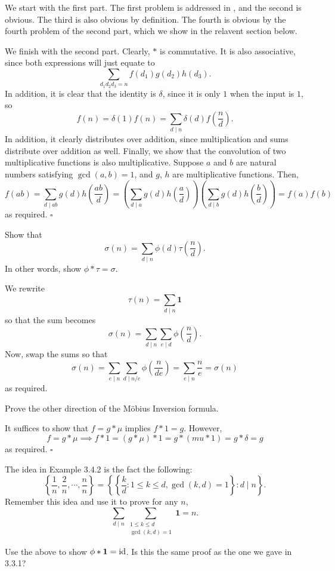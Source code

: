 \documentclass{article}
\begin{document}
We start with the first part. The first problem is addressed in , and the second is obvious. The third is also obvious by definition. The fourth is obvious by the fourth problem of the second part, which we show in the relavent section below.

We finish with the second part. Clearly, $*$ is commutative. It is also associative, since both expressions will just equate to \[\sum_{d_1d_2d_3 = n}f(d_1)g(d_2)h(d_3).\] In addition, it is clear that the identity is $\delta$, since it is only $1$ when the input is $1$, so \[f(n) = \delta(1)f(n) = \sum_{d \mid n}\delta(d)f\left(\dfrac{n}{d}\right).\] In addition, it clearly distributes over addition, since multiplication and sums distribute over addition as well. Finally, we show that the convolution of two multiplicative functions is also multiplicative. Suppose $a$ and $b$ are natural numbers satisfying $\gcd(a, b) = 1$, and $g$, $h$ are multiplicative functions. Then, \[f(ab) = \sum_{d \mid ab} g(d)h\left(\dfrac{ab}{d}\right) = \left(\sum_{d \mid a} g(d)h\left(\dfrac{a}{d}\right)\right)\left(\sum_{d \mid b} g(d)h\left(\dfrac{b}{d}\right)\right) = f(a)f(b)\] as required. $\square$

\begin{problem}[3.4.4]{}
Show that \[\sigma(n) = \sum_{d\mid n} \phi(d)\tau\left(\dfrac{n}{d}\right).\] In other words, show $\phi * \tau = \sigma$.
\end{problem}

We rewrite \[\tau(n) = \sum_{d \mid n} \mathbf{1}\] so that the sum becomes \[\sigma(n) = \sum_{d\mid n} \sum_{e \mid d} \phi\left(\dfrac{n}{d}\right).\] Now, swap the sums so that \[\sigma(n) = \sum_{e\mid n} \sum_{d \mid n/e} \phi\left(\dfrac{n}{de}\right) = \sum_{e\mid n} \dfrac{n}{e} = \sigma(n)\] as required.

\begin{problem}[3.4.5]{}
Prove the other direction of the M\"{o}bius Inversion formula.
\end{problem}

It suffices to show that $f = g * \mu$ implies $f * 1 = g$. However, \[f = g * \mu \implies f * 1 = (g * \mu) * 1 = g * (mu * 1) = g * \delta = g\] as required. $\square$

\begin{problem}[3.4.6]{}
The idea in Example 3.4.2 is the fact the following: \[\left\{\dfrac{1}{n}, \dfrac{2}{n}, \cdots, \dfrac{n}{n}\right\} = \left\{\left\{\dfrac{k}{d}:1\le k \le d, \gcd(k, d) = 1\right\} : d \mid n\right\}.\] Remember this idea and use it to prove for any $n$, \[\sum_{d \mid n}\sum_{\substack{1 \le k \le d\\ \gcd(k, d) = 1}} \mathbf{1} = n.\]

Use the above to show $\phi * \mathbf{1} = \operatorname{id}$. Is this the same proof as the one we gave in 3.3.1?
\end{problem}
\end{document}
